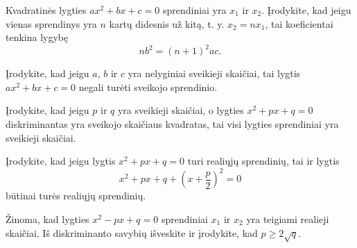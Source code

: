 \documentclass[11pt,a4paper]{scrartcl}
\begin{document}
\begin{problem}
    Kvadratinės lygties $ax^2+bx+c=0$ sprendiniai yra $x_1$ ir $x_2$. Įrodykite, kad jeigu vienas sprendinys yra $n$ kartų didesnis už kitą, t. y. $x_2=nx_1$, tai koeficientai tenkina lygybę
    \[
    nb^2=(n+1)^2ac.
    \]
\end{problem}

\begin{problem}
    Įrodykite, kad jeigu $a$, $b$ ir $c$ yra nelyginiai sveikieji skaičiai, tai lygtis $ax^2+bx+c=0$ negali turėti sveikojo sprendinio.
\end{problem}

\begin{problem}
    Įrodykite, kad jeigu $p$ ir $q$ yra sveikieji skaičiai, o lygties $x^2+px+q=0$ diskriminantas yra sveikojo skaičiaus kvadratas, tai visi lygties sprendiniai yra sveikieji skaičiai.
\end{problem}

\begin{problem}
    Įrodykite, kad jeigu lygtis $x^2+px+q=0$ turi realiųjų sprendinių, tai ir lygtis
    \[
    x^2+px+q+\left(x+\frac{p}{2}\right)^2=0
    \]
    būtinai turės realiųjų sprendinių.
\end{problem}

\begin{problem}
    Žinoma, kad lygties $x^2-px+q=0$ sprendiniai $x_1$ ir $x_2$ yra teigiami realieji skaičiai. Iš diskriminanto savybių išveskite ir įrodykite, kad $p\ge 2\sqrt q$.
\end{problem}
\end{document}
